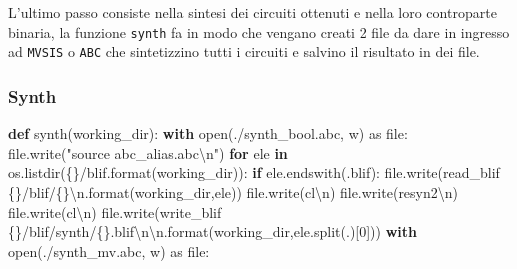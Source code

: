 \documentclass[
  italian,
]{book}
\newenvironment{Shaded}{\begin{snugshade}}{\end{snugshade}}
\newcommand{\BuiltInTok}[1]{#1}
\newcommand{\CharTok}[1]{\textcolor[rgb]{0.31,0.60,0.02}{#1}}
\newcommand{\ControlFlowTok}[1]{\textcolor[rgb]{0.13,0.29,0.53}{\textbf{#1}}}
\newcommand{\DecValTok}[1]{\textcolor[rgb]{0.00,0.00,0.81}{#1}}
\newcommand{\ImportTok}[1]{#1}
\newcommand{\KeywordTok}[1]{\textcolor[rgb]{0.13,0.29,0.53}{\textbf{#1}}}
\newcommand{\NormalTok}[1]{#1}
\newcommand{\SpecialCharTok}[1]{\textcolor[rgb]{0.00,0.00,0.00}{#1}}
\newcommand{\StringTok}[1]{\textcolor[rgb]{0.31,0.60,0.02}{#1}}
\begin{document}
L'ultimo passo consiste nella sintesi dei circuiti ottenuti e nella loro controparte binaria, la funzione \texttt{synth} fa in modo che vengano creati 2 file da dare in ingresso ad \texttt{MVSIS} o \texttt{ABC} che sintetizzino tutti i circuiti e salvino il risultato in dei file.

\hypertarget{synth}{%
\subsubsection{Synth}\label{synth}}

\begin{Shaded}
\begin{Highlighting}[]
\KeywordTok{def}\NormalTok{ synth(working\_dir):  }
  \ControlFlowTok{with} \BuiltInTok{open}\NormalTok{(}\StringTok{\textquotesingle{}./synth\_bool.abc\textquotesingle{}}\NormalTok{, }\StringTok{\textquotesingle{}w\textquotesingle{}}\NormalTok{) }\ImportTok{as} \BuiltInTok{file}\NormalTok{:}
    \BuiltInTok{file}\NormalTok{.write(}\StringTok{"source abc\_alias.abc}\CharTok{\textbackslash{}n}\StringTok{"}\NormalTok{)}
    \ControlFlowTok{for}\NormalTok{ ele }\KeywordTok{in}\NormalTok{ os.listdir(}\StringTok{\textquotesingle{}}\SpecialCharTok{\{\}}\StringTok{/blif\textquotesingle{}}\NormalTok{.}\BuiltInTok{format}\NormalTok{(working\_dir)):}
      \ControlFlowTok{if}\NormalTok{ ele.endswith(}\StringTok{\textquotesingle{}.blif\textquotesingle{}}\NormalTok{):}
        \BuiltInTok{file}\NormalTok{.write(}\StringTok{\textquotesingle{}read\_blif }\SpecialCharTok{\{\}}\StringTok{/blif/}\SpecialCharTok{\{\}}\CharTok{\textbackslash{}n}\StringTok{\textquotesingle{}}\NormalTok{.}\BuiltInTok{format}\NormalTok{(working\_dir,ele))}
        \BuiltInTok{file}\NormalTok{.write(}\StringTok{\textquotesingle{}cl}\CharTok{\textbackslash{}n}\StringTok{\textquotesingle{}}\NormalTok{)}
        \BuiltInTok{file}\NormalTok{.write(}\StringTok{\textquotesingle{}resyn2}\CharTok{\textbackslash{}n}\StringTok{\textquotesingle{}}\NormalTok{)}
        \BuiltInTok{file}\NormalTok{.write(}\StringTok{\textquotesingle{}cl}\CharTok{\textbackslash{}n}\StringTok{\textquotesingle{}}\NormalTok{)}
        \BuiltInTok{file}\NormalTok{.write(}\StringTok{\textquotesingle{}write\_blif }\SpecialCharTok{\{\}}\StringTok{/blif/synth/}\SpecialCharTok{\{\}}\StringTok{.blif}\CharTok{\textbackslash{}n\textbackslash{}n}\StringTok{\textquotesingle{}}\NormalTok{.}\BuiltInTok{format}\NormalTok{(working\_dir,ele.split(}\StringTok{\textquotesingle{}.\textquotesingle{}}\NormalTok{)[}\DecValTok{0}\NormalTok{]))}
  \ControlFlowTok{with} \BuiltInTok{open}\NormalTok{(}\StringTok{\textquotesingle{}./synth\_mv.abc\textquotesingle{}}\NormalTok{, }\StringTok{\textquotesingle{}w\textquotesingle{}}\NormalTok{) }\ImportTok{as} \BuiltInTok{file}\NormalTok{:}

\end{Highlighting}
\end{Shaded}
\end{document}
